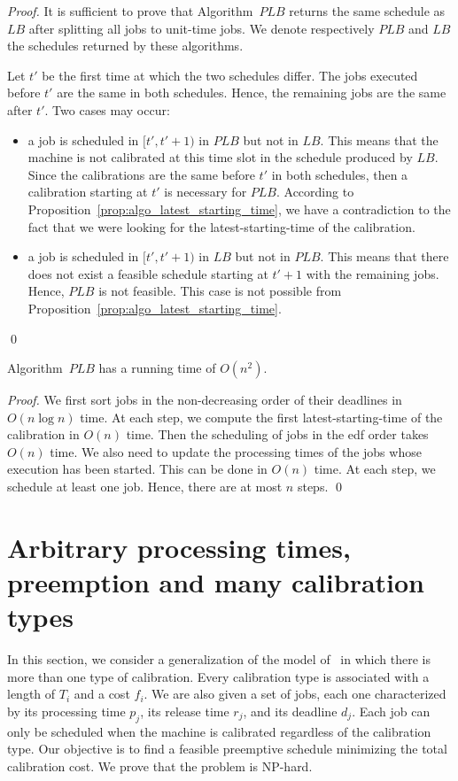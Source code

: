 \begin{proof}
It is sufficient to prove that Algorithm~$PLB$ returns the same schedule as $LB$ after splitting all jobs to unit-time jobs. We denote respectively $PLB$ and $LB$ the schedules returned by these algorithms.

Let $t'$ be the first time at which the two schedules differ. The jobs executed before $t'$ are the same in both schedules. Hence, the remaining jobs are the same after $t'$. Two cases may occur:
\begin{itemize}
\item a job is scheduled in $[t',t'+1)$ in $PLB$ but not in $LB$.
This means that the machine is not calibrated at this time slot in the schedule produced by $LB$.
Since the calibrations are the same before $t'$ in both schedules, then a calibration starting at $t'$ is necessary for $PLB$. According to Proposition~\ref{prop:algo_latest_starting_time}, we have a contradiction to the fact that we were looking for the latest-starting-time of the calibration.
\item a job is scheduled in $[t',t'+1)$ in $LB$ but not in $PLB$. This means that there does not exist a feasible schedule starting at $t'+1$ with the remaining jobs. Hence, $PLB$ is not feasible. This case is not possible from Proposition~\ref{prop:algo_latest_starting_time}.
\end{itemize}
\qed\end{proof}


\begin{prop}
Algorithm~$PLB$ has a running time of $O(n^2)$.
\end{prop}

\begin{proof}
We first sort jobs in the non-decreasing order of their deadlines in $O(n\log n)$ time. At each step, we compute the first latest-starting-time of the calibration in $O(n)$ time. Then the scheduling of jobs in the {\sc edf} order takes $O(n)$ time. We also need to update the processing times of the jobs whose execution has been started. This can be done in $O(n)$ time. At each step, we schedule at least one job. Hence, there are at most $n$ steps.
\qed\end{proof}

\section{Arbitrary processing times, preemption and many calibration types}
\label{sec:arbitrary_pj}
In this section, we consider a generalization of the model of~\cite{bender2013efficient} in which there is more than one type of calibration. Every calibration type is associated with a length of $T_i$ and a cost $f_i$. We are also given a set of jobs, each one characterized by its processing time $p_j$, its release time $r_j$, and its deadline $d_j$. Each job can only be scheduled when the machine is calibrated regardless of the calibration type. Our objective is to find a feasible preemptive schedule minimizing the total calibration cost. We prove that the problem is NP-hard.

